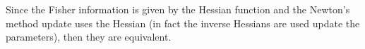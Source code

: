 \begin{answer}
 Since the Fisher information is given by the Hessian function and the Newton's method update uses the Hessian (in fact the inverse Hessians are used update the parameters), then they are equivalent.



\end{answer}
